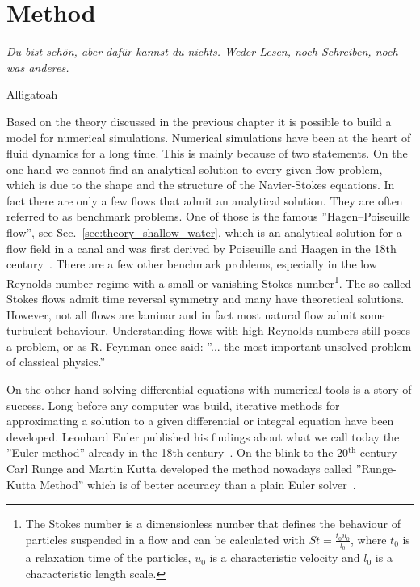 \chapter{Method}
\label{chapter:method}
\epigraph{\textit{Du bist schön, aber dafür kannst du nichts.
Weder Lesen, noch Schreiben, noch was anderes.}}{Alligatoah}
Based on the theory discussed in the previous chapter it is possible to build a model for numerical simulations.
Numerical simulations have been at the heart of fluid dynamics for a long time.
This is mainly because of two statements.
On the one hand we cannot find an analytical solution to every given flow problem, which is due to the shape and the structure of the Navier-Stokes equations.
In fact there are only a few flows that admit an analytical solution. 
They are often referred to as benchmark problems.
One of those is the famous ''Hagen–Poiseuille flow'', see  Sec.~\ref{sec:theory_shallow_water}, which is an analytical solution for a flow field in a canal and was first derived by Poiseuille and Haagen in the 18th century~\cite{suteraHistoryPoiseuilleLaw}.
There are a few other benchmark problems, especially in the low Reynolds number regime with a small or vanishing Stokes number\footnote{The Stokes number is a dimensionless number that defines the behaviour of particles suspended in a flow and can be calculated with $St = \frac{t_0u_0}{l_0}$, where $t_0$ is a relaxation time of the particles, $u_0$ is a characteristic velocity and $l_0$ is a characteristic length scale.}.
The so called Stokes flows admit time reversal symmetry and many have theoretical solutions.
However, not all flows are laminar and in fact most natural flow admit some turbulent behaviour. 
Understanding flows with high Reynolds numbers still poses a problem, or as R. Feynman once said: ''... the most important unsolved problem of classical physics.''

On the other hand solving differential equations with numerical tools is a story of success.
Long before any computer was build, iterative methods for approximating a solution to a given differential or integral equation have been developed.
Leonhard Euler published his findings about what we call today the ''Euler-method'' already in the 18th century~\cite{brezinskiNumericalAnalysisHistorical2012}.
On the blink to the 20$^{\text{th}}$ century Carl Runge and Martin Kutta developed the method nowadays called ''Runge-Kutta Method'' which is of better accuracy than a plain Euler solver~\cite{wBeitragZurNaherungsweisen1901, rungeUeberNumerischeAufloesung1895}.

